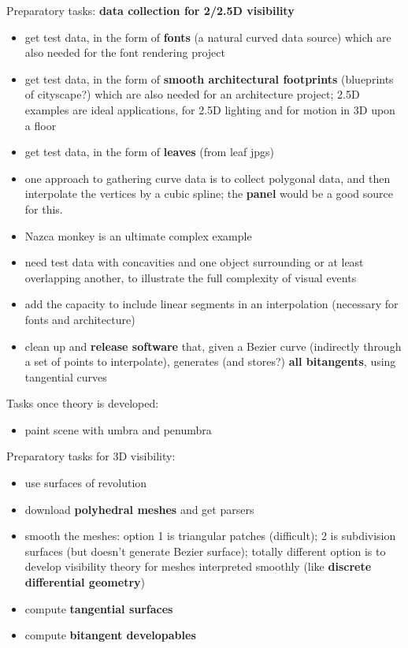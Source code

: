\documentclass[12pt]{article}
\begin{document}
\clearpage


Preparatory tasks: {\bf data collection for 2/2.5D visibility}

\begin{itemize}
\item get test data, in the form of {\bf fonts} (a natural curved data source) which are also
      needed for the font rendering project
\item get test data, in the form of {\bf smooth architectural footprints} 
  (blueprints of cityscape?) which are also needed for an architecture project;
  2.5D examples are ideal applications, for 2.5D lighting 
  and for motion in 3D upon a floor
\item get test data, in the form of {\bf leaves} (from leaf jpgs)
\item one approach to gathering curve data is to collect polygonal data,
      and then interpolate the vertices by a cubic spline; the {\bf panel} 
      would be a good source for this.
\item Nazca monkey is an ultimate complex example
\item need test data with concavities and one object surrounding or at least overlapping
      another, to illustrate the full complexity of visual events
\item add the capacity to include linear segments 
      in an interpolation (necessary for fonts and architecture)
\item clean up and {\bf release software} that, given a Bezier curve (indirectly through a set of points
      to interpolate), generates (and stores?) {\bf all bitangents},
      using tangential curves
\end{itemize}

Tasks once theory is developed:

\begin{itemize}
\item paint scene with umbra and penumbra
\end{itemize}

Preparatory tasks for 3D visibility:

\begin{itemize}
\item use surfaces of revolution
\item download {\bf polyhedral meshes} and get parsers
\item smooth the meshes: option 1 is triangular patches (difficult); 2 is subdivision surfaces (but doesn't generate Bezier surface); totally different option is to develop
  visibility theory for meshes interpreted smoothly (like {\bf discrete differential geometry})
\item compute {\bf tangential surfaces}
\item compute {\bf bitangent developables}
\end{itemize}
\end{document}
